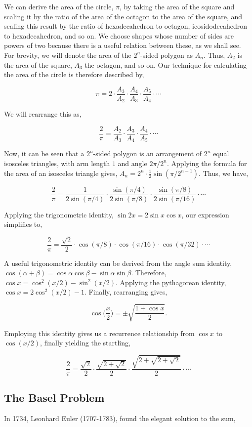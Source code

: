 \documentclass[11pt]{amsart}
\begin{document}
We can derive the area of the circle, $\pi$, by taking the area of the square and scaling it by the ratio of the area of the octagon to the area of the square, and scaling this result by the ratio of hexadecahedron to octagon, icosidodecahedron to hexadecahedron, and so on. We choose shapes whose number of sides are powers of two because there is a useful relation between these, as we shall see. For brevity, we will denote the area of the $2^n$-sided polygon as $A_n$. Thus, $A_2$ is the area of the square, $A_3$ the octagon, and so on. Our technique for calculating the area of the circle is therefore described by,

$$
\pi = 2 \cdot \frac{A_3}{A_2} \cdot \frac{A_4}{A_3} \cdot \frac{A_5}{A_4} \cdot \cdots
$$

We will rearrange this as,

$$
\frac{2}{\pi} = \frac{A_2}{A_3} \cdot \frac{A_3}{A_4} \cdot \frac{A_4}{A_5} \cdot \cdots
$$

Now, it can be seen that a $2^n$-sided polygon is an arrangement of $2^n$ equal isosceles triangles, with arm length $1$ and angle $2\pi/2^n$. Applying the formula for the area of an isosceles triangle gives, $A_n = 2^{n}\cdot\frac{1}{2}\sin(\pi / 2^{n-1})$. Thus, we have,

$$
\frac{2}{\pi} = \frac{1}{2\sin(\pi/4)} \cdot \frac{\sin(\pi/4)}{2\sin(\pi/8)} \cdot \frac{\sin(\pi/8)}{2\sin(\pi/16)} \cdot \cdots
$$

Applying the trigonometric identity, $\sin{2x} = 2\sin x\cos x$, our expression simplifies to,

$$
\frac{2}{\pi} = \frac{\sqrt{2}}{2} \cdot \cos(\pi/8) \cdot \cos(\pi/16) \cdot \cos(\pi/32) \cdot \cdots
$$

A useful trigonometric identity can be derived from the angle sum identity, $\cos(\alpha + \beta) = \cos\alpha\cos\beta - \sin\alpha\sin\beta$. Therefore, $\cos x = \cos^2(x/2) - \sin^2(x/2)$. Applying the pythagorean identity, $\cos x = 2\cos^2(x/2) - 1$. Finally, rearranging gives,

$$\cos \Big(\frac{x}{2}\Big) = \pm\sqrt{\frac{1 + \cos x}{2}}.$$

Employing this identity gives us a recurrence relationship from $\cos x$ to $\cos(x/2)$, finally yielding the startling,

$$
\frac{2}{\pi} = \frac{\sqrt{2}}{2} \cdot \frac{\sqrt{2 + \sqrt{2}}}{2} \cdot \frac{\sqrt{2 + \sqrt{2 + \sqrt{2}}}}{2} \cdot \cdots
$$

\subsection{The Basel Problem}
In 1734, Leonhard Euler (1707-1783), found the elegant solution to the sum,
\end{document}
